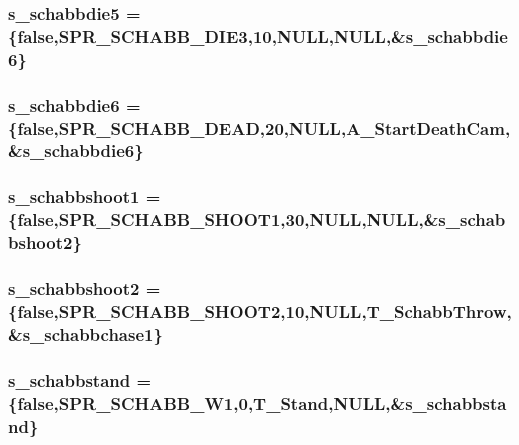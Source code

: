 \label{WL__ACT2_8C_a0264665a73e503feeb4394daeaf1f725}
\hypertarget{WL__ACT2_8C_abd5a4ffcf29513a1761f11307531073b}{
\subsubsection[{s\_\-schabbdie5}]{ {\bf s\_\-schabbdie5} = \{false,SPR\_\-SCHABB\_\-DIE3,10,NULL,NULL,\&{\bf s\_\-schabbdie6}\}}}
\label{WL__ACT2_8C_abd5a4ffcf29513a1761f11307531073b}
\hypertarget{WL__ACT2_8C_aaaeeadbf796f6d04b81b59c0095fc584}{
\subsubsection[{s\_\-schabbdie6}]{ {\bf s\_\-schabbdie6} = \{false,SPR\_\-SCHABB\_\-DEAD,20,NULL,A\_\-StartDeathCam,\&{\bf s\_\-schabbdie6}\}}}
\label{WL__ACT2_8C_aaaeeadbf796f6d04b81b59c0095fc584}
\hypertarget{WL__ACT2_8C_ab2279415dbaa1c3d37bf891db55fa894}{
\subsubsection[{s\_\-schabbshoot1}]{ {\bf s\_\-schabbshoot1} = \{false,SPR\_\-SCHABB\_\-SHOOT1,30,NULL,NULL,\&{\bf s\_\-schabbshoot2}\}}}
\label{WL__ACT2_8C_ab2279415dbaa1c3d37bf891db55fa894}
\hypertarget{WL__ACT2_8C_ad8ae8bf714597c5548b31aea767637cc}{
\subsubsection[{s\_\-schabbshoot2}]{ {\bf s\_\-schabbshoot2} = \{false,SPR\_\-SCHABB\_\-SHOOT2,10,NULL,T\_\-SchabbThrow,\&{\bf s\_\-schabbchase1}\}}}
\label{WL__ACT2_8C_ad8ae8bf714597c5548b31aea767637cc}
\hypertarget{WL__ACT2_8C_a96c8ad498d80bfcb7bb739872d571ac2}{
\subsubsection[{s\_\-schabbstand}]{ {\bf s\_\-schabbstand} = \{false,SPR\_\-SCHABB\_\-W1,0,T\_\-Stand,NULL,\&{\bf s\_\-schabbstand}\}}}
